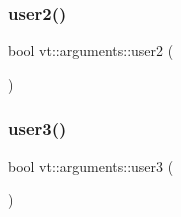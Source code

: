 \subsubsection{\texorpdfstring{user2()}{user2()}}
{\footnotesize\ttfamily bool vt\+::arguments\+::user2 (\begin{DoxyParamCaption}{ }\end{DoxyParamCaption})\hspace{0.3cm}{\ttfamily [inline]}}

\mbox{\label{namespacevt_1_1arguments_afedf2c9949568b862ec5f8274ef6846b}} 
\subsubsection{\texorpdfstring{user3()}{user3()}}
{\footnotesize\ttfamily bool vt\+::arguments\+::user3 (\begin{DoxyParamCaption}{ }\end{DoxyParamCaption})\hspace{0.3cm}{\ttfamily [inline]}}

